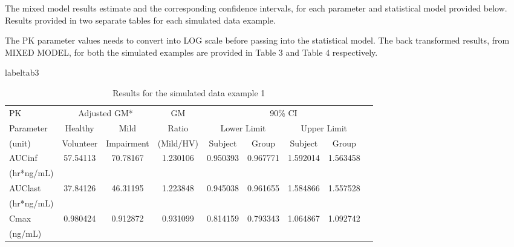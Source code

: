 \documentclass[final]{statistica}
\begin{document}
\vspace{3mm}
\par
The mixed model results estimate and the corresponding confidence intervals, for each parameter and statistical model provided below. Results provided in two separate tables for each simulated data example.
\vspace{3mm}
\par
The PK parameter values needs to convert into LOG scale before passing into the statistical model. The back transformed results, from MIXED MODEL, for both the simulated examples are provided in Table 3 and Table 4 respectively.
\vspace{3mm}

\begin{table}
	\centering
	\caption{Results for the simulated data example 1}label{tab3}
	\begin{tabular}{|l|c|c|c|c|c|c|c|c|}
		\hline
		PK & \multicolumn{2}{c|}{Adjusted GM*} & GM & \multicolumn{4}{c|}{90\% CI} \\
		\cline{2-3} \cline{5-8}
		Parameter & Healthy & Mild & Ratio & \multicolumn{2}{c|}{Lower Limit} & \multicolumn{2}{c|}{Upper Limit} \\ \cline{5-8}
		(unit) & Volunteer & Impairment & (Mild/HV) & Subject & Group & Subject & Group \\
		\hline
        AUCinf & \multirow{2}{*}{57.54113} & \multirow{2}{*}{70.78167} & \multirow{2}{*}{1.230106} & \multirow{2}{*}{0.950393} & \multirow{2}{*}{0.967771} & \multirow{2}{*}{1.592014} & \multirow{2}{*}{1.563458} \\
        (hr*ng/mL) & & & & & & & \\ \hline
        AUClast & \multirow{2}{*}{37.84126} & \multirow{2}{*}{46.31195} & \multirow{2}{*}{1.223848} & \multirow{2}{*}{0.945038} & \multirow{2}{*}{0.961655} & \multirow{2}{*}{1.584866} & \multirow{2}{*}{1.557528} \\
        (hr*ng/mL) & & & & & & & \\ \hline
        Cmax & \multirow{2}{*}{0.980424} & \multirow{2}{*}{0.912872} & \multirow{2}{*}{0.931099} & \multirow{2}{*}{0.814159} & \multirow{2}{*}{0.793343} & \multirow{2}{*}{1.064867} & \multirow{2}{*}{1.092742} \\
        (ng/mL) & & & & & & & \\ \hline
	\end{tabular}
\end{table}

\vspace{3mm}
\end{document}

